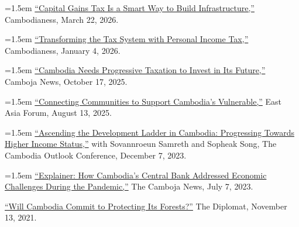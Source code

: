 \documentclass[10pt,a4paper]{article}
\begin{document}
	
	\hangindent=1.5em
	\href{https://cambodianess.com/article/capital-gains-tax-is-a-smart-way-to-build-infrastructure}{``Capital Gains Tax Is a Smart Way to Build Infrastructure,''} Cambodianess, March 22, 2026.\\ \vspace{-.5em}
	
	
	\hangindent=1.5em
\href{https://cambodianess.com/article/transforming-the-tax-system-with-personal-income-tax}{``Transforming the Tax System with Personal Income Tax,''} Cambodianess, January 4, 2026.\\ \vspace{-.5em}


	\hangindent=1.5em
	\href{https://cambojanews.com/op-ed-cambodia-needs-progressive-taxation-to-invest-in-its-future/}{``Cambodia Needs Progressive Taxation to Invest in Its Future,''} Camboja News, October 17, 2025.\\ \vspace{-.5em}


	\hangindent=1.5em
	\href{https://eastasiaforum.org/2025/08/13/connecting-communities-to-support-cambodias-vulnerable/}{``Connecting Communities to Support Cambodia’s Vulnerable,''} East Asia Forum, August 13, 2025.\\ \vspace{-.5em}
	

	\hangindent=1.5em
	\href{https://coc2023.cdri.org.kh/ascending-the-development-ladder-in-cambodia-progressing-towards-higher-income-status/}{``Ascending the Development Ladder in Cambodia: Progressing Towards Higher Income Status,''} with Sovannroeun Samreth and Sopheak Song, The Cambodia Outlook Conference, December 7, 2023.\\ \vspace{-.5em}
	
	\hangindent=1.5em
	\href{https://cambojanews.com/explainer-how-cambodias-central-bank-addressed-economic-challenges-during-the-pandemic/}{``Explainer: How Cambodia's Central Bank Addressed Economic Challenges During the Pandemic,''} The Camboja News, July 7, 2023.\\ \vspace{-.5em}
	
	\href{https://thediplomat.com/2021/11/will-cambodia-commit-to-protecting-its-forests/}{``Will Cambodia Commit to Protecting Its Forests?''} The Diplomat, November 13, 2021.\\ \vspace{-.5em}
\end{document}
